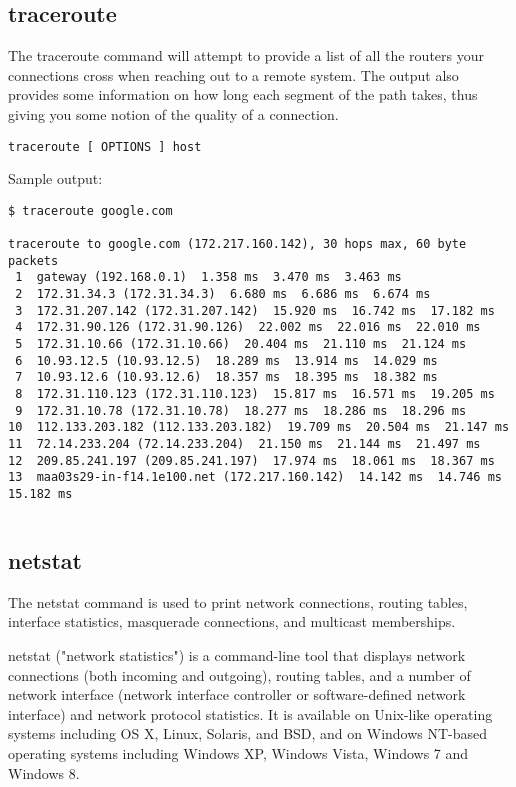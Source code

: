 \documentclass[a4paper,12pt]{article}
\begin{document}
\subsection{traceroute}
The traceroute command will attempt to provide a list of all the routers your connections cross when reaching out to a remote system. The output also provides some information on how long each segment of the path takes, thus giving you some notion of the quality of a connection.

\begin{verbatim}
traceroute [ OPTIONS ] host
\end{verbatim}

Sample output:
\begin{verbatim}
$ traceroute google.com

traceroute to google.com (172.217.160.142), 30 hops max, 60 byte packets
 1  gateway (192.168.0.1)  1.358 ms  3.470 ms  3.463 ms
 2  172.31.34.3 (172.31.34.3)  6.680 ms  6.686 ms  6.674 ms
 3  172.31.207.142 (172.31.207.142)  15.920 ms  16.742 ms  17.182 ms
 4  172.31.90.126 (172.31.90.126)  22.002 ms  22.016 ms  22.010 ms
 5  172.31.10.66 (172.31.10.66)  20.404 ms  21.110 ms  21.124 ms
 6  10.93.12.5 (10.93.12.5)  18.289 ms  13.914 ms  14.029 ms
 7  10.93.12.6 (10.93.12.6)  18.357 ms  18.395 ms  18.382 ms
 8  172.31.110.123 (172.31.110.123)  15.817 ms  16.571 ms  19.205 ms
 9  172.31.10.78 (172.31.10.78)  18.277 ms  18.286 ms  18.296 ms
10  112.133.203.182 (112.133.203.182)  19.709 ms  20.504 ms  21.147 ms
11  72.14.233.204 (72.14.233.204)  21.150 ms  21.144 ms  21.497 ms
12  209.85.241.197 (209.85.241.197)  17.974 ms  18.061 ms  18.367 ms
13  maa03s29-in-f14.1e100.net (172.217.160.142)  14.142 ms  14.746 ms  15.182 ms

\end{verbatim}
\begin{verbatim}

\end{verbatim}

\subsection{netstat}

The netstat command is used to print network connections, routing tables, interface statistics, masquerade connections, and multicast memberships.

netstat ("network statistics") is a command-line tool that displays network connections (both incoming and outgoing), routing tables, and a number of network interface (network interface controller or software-defined network interface) and network protocol statistics. It is available on Unix-like operating systems including OS X, Linux, Solaris, and BSD, and on Windows NT-based operating systems including Windows XP, Windows Vista, Windows 7 and Windows 8.
\end{document}
